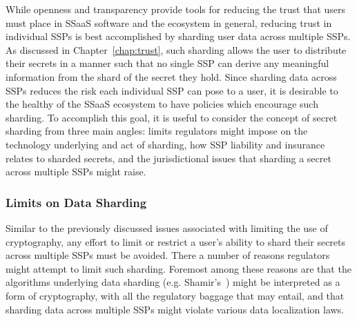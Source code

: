 While openness and transparency provide tools for reducing the trust
that users must place in SSaaS software and the ecosystem in general,
reducing trust in individual SSPs is best accomplished by sharding
user data across multiple SSPs. As discussed in
Chapter~\ref{chap:trust}, such sharding allows the user to distribute
their secrets in a manner such that no single SSP can derive any
meaningful information from the shard of the secret they hold. Since
sharding data across SSPs reduces the risk each individual SSP can
pose to a user, it is desirable to the healthy of the SSaaS ecosystem
to have policies which encourage such sharding. To accomplish this
goal, it is useful to consider the concept of secret sharding from
three main angles: limits regulators might impose on the technology
underlying and act of sharding, how SSP liability and insurance
relates to sharded secrets, and the jurisdictional issues that
sharding a secret across multiple SSPs might raise.

\subsubsection{Limits on Data Sharding}

Similar to the previously discussed issues associated with limiting
the use of cryptography, any effort to limit or restrict a user's
ability to shard their secrets across multiple SSPs must be
avoided. There a number of reasons regulators might attempt to limit
such sharding. Foremost among these reasons are that the algorithms
underlying data sharding (e.g. Shamir's~\cite{shamir1979}) might be
interpreted as a form of cryptography, with all the regulatory baggage
that may entail, and that sharding data across multiple SSPs might
violate various data localization laws.

